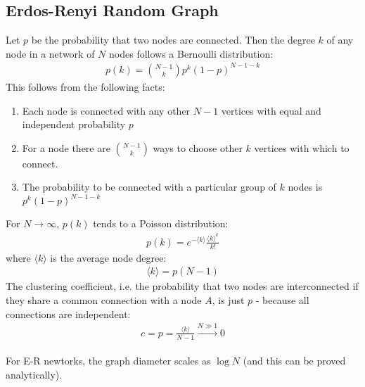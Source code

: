 \documentclass[../template.tex]{subfiles}
\begin{document}
\subsection{Erdos-Renyi Random Graph}
Let $p$ be the probability that two nodes are connected. Then the degree $k$ of any node in a network of $N$ nodes follows a Bernoulli distribution:
\begin{align*}
    p(k) = {N-1 \choose k} p^k (1-p)^{N-1-k}
\end{align*}
This follows from the following facts:
\begin{enumerate}
    \item Each node is connected with any other $N-1$ vertices with equal and independent probability $p$
    \item For a node there are ${N-1 \choose k}$ ways to choose other $k$ vertices with which to connect. 
    \item The probability to be connected with a particular group of $k$ nodes is $p^k(1-p)^{N-1-k}$
\end{enumerate}
For $N \to \infty$, $p(k)$ tends to a Poisson distribution:
\begin{align*}
    p(k) = e^{-\langle k \rangle} \frac{\langle k \rangle^k}{k!} 
\end{align*}
where $\langle k \rangle$ is the average node degree:
\begin{align*}
    \langle k \rangle = p(N-1)
\end{align*}
The clustering coefficient, i.e. the probability that two nodes are interconnected if they share a common connection with a node $A$, is just $p$ - because all connections are independent:
\begin{align*}
    c = p = \frac{\langle k \rangle}{N-1} \xrightarrow[]{N \gg 1} 0 
\end{align*}

For E-R newtorks, the graph diameter scales as $\log N$ (and this can be proved analytically).
\end{document}
